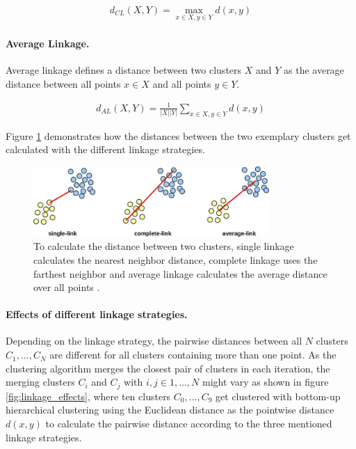 \begin{equation*}
    \begin{aligned}
        d_{CL}(X,Y) = \max\limits_{x \in X, y \in Y} d(x,y)
    \end{aligned}
    \label{eq:completelinkage}
\end{equation*}

\paragraph{Average Linkage.}

Average linkage defines a distance between two clusters $X$ and $Y$ as the average distance between all points $x \in X$ and all points $y \in Y$.

\begin{equation*}
    \begin{aligned}
        d_{AL}(X,Y) = \frac{1}{|X||Y|}\sum\limits_{x \in X, y \in Y} d(x,y)
    \end{aligned}
    \label{eq:averagelinkage}
\end{equation*}

Figure \ref{fig:linkage_types} demonstrates how the distances between the two exemplary clusters get calculated with the different linkage strategies.

\begin{figure}[h]
    \centering
    \includegraphics[width=0.8\textwidth]{images/linkage_types}
    \caption{To calculate the distance between two clusters, single linkage calculates the nearest neighbor distance, complete linkage uses the farthest neighbor and average linkage calculates the average distance over all points \cite{linkage_types}.}
    \label{fig:linkage_types}
\end{figure}

\paragraph{Effects of different linkage strategies.}

Depending on the linkage strategy, the pairwise distances between all $N$ clusters $C_1, ..., C_N$ are different for all clusters containing more than one point. As the clustering algorithm merges the closest pair of clusters in each iteration, the merging clusters $C_i$ and $C_j$ with $i, j \in 1,...,N$ might vary as shown in figure \ref{fig:linkage_effects}, where ten clusters $C_0, ..., C_9$ get clustered with bottom-up hierarchical clustering using the Euclidean distance as the pointwise distance $d(x,y)$ to calculate the pairwise distance according to the three mentioned linkage strategies.

